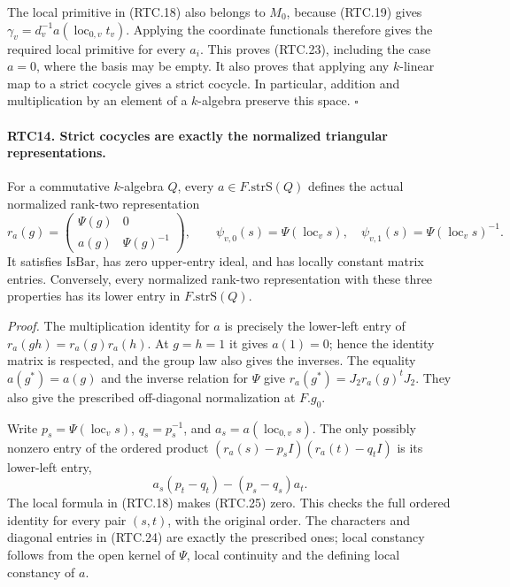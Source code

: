 \documentclass[11pt,a4paper]{article}
\numberwithin{equation}{section}
\theoremstyle{remark}\newtheorem{remark}[theorem]{Remark}
\begin{document}
The local primitive in (RTC.18) also belongs to \(M_0\), because
(RTC.19) gives
\(\gamma_v=d_v^{-1}a(\operatorname{loc}_{0,v}t_v)\).
Applying the coordinate functionals therefore gives the required
local primitive for every \(a_i\).  This proves (RTC.23), including
the case \(a=0\), where the basis may be empty.  It also proves
that applying any \(k\)-linear map to a strict cocycle gives a
strict cocycle.  In particular, addition and multiplication by an
element of a \(k\)-algebra preserve this space. \hfill\(\square\)

\paragraph{RTC14. Strict cocycles are exactly the normalized triangular representations.}
\label{claim:RTC14}
For a commutative \(k\)-algebra \(Q\), every
\(a\in F.\mathrm{strS}(Q)\) defines the actual normalized
rank-two representation
\[
 r_a(g)=
 \begin{pmatrix}\Psi(g)&0\\a(g)&\Psi(g)^{-1}\end{pmatrix},
 \qquad
 \psi_{v,0}(s)=\Psi(\operatorname{loc}_v s),\quad
 \psi_{v,1}(s)=\Psi(\operatorname{loc}_v s)^{-1}.
                                                        \tag{RTC.24}
\]
It satisfies \(\mathrm{IsBar}\), has zero upper-entry ideal,
and has locally constant matrix entries.  Conversely, every normalized
rank-two representation with these three properties has its lower
entry in \(F.\mathrm{strS}(Q)\).

\emph{Proof.}
The multiplication identity for \(a\) is precisely the lower-left
entry of \(r_a(gh)=r_a(g)r_a(h)\).  At \(g=h=1\) it gives
\(a(1)=0\); hence the identity matrix is respected, and the
group law also gives the inverses.  The equality
\(a(g^*)=a(g)\) and the inverse relation for \(\Psi\) give
\(r_a(g^*)=J_2r_a(g)^tJ_2\).  They also give the prescribed
off-diagonal normalization at \(F.g_0\).

Write \(p_s=\Psi(\operatorname{loc}_v s)\),
\(q_s=p_s^{-1}\), and \(a_s=a(\operatorname{loc}_{0,v}s)\).
The only possibly nonzero entry of the ordered product
\((r_a(s)-p_sI)(r_a(t)-q_tI)\) is its lower-left entry,
\[
 a_s(p_t-q_t)-(p_s-q_s)a_t.
                                                        \tag{RTC.25}
\]
The local formula in (RTC.18) makes (RTC.25) zero.  This checks
the full ordered identity for every pair \((s,t)\), with the
original order.  The characters and diagonal entries in (RTC.24)
are exactly the prescribed ones; local constancy follows from the
open kernel of \(\Psi\), local continuity and the defining
local constancy of \(a\).
\end{document}
